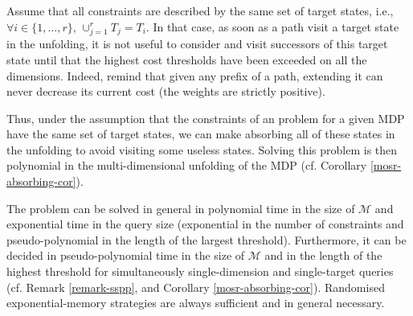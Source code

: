 \begin{remark} \label{remark-sspp}
  Assume that all constraints are described by the same set of target states, i.e., $\forall i \in \{1, \dots, r\}$, $\cup_{j=1}^r T_j = T_i$.
  In that case, as soon as a path visit a target state in the unfolding, it is not useful to consider and visit successors of this target state until that the highest cost thresholds have been exceeded on all the dimensions.
  Indeed, remind that given any prefix of a path, extending it can never decrease its current cost %
  (the weights are strictly positive).\par
  Thus, under the assumption that the constraints of an \SSPPQ{} problem for a given MDP have the same set of target states, we can make absorbing all of these states in the unfolding to avoid visiting some useless states.
  Solving this \SSPPQ{} problem is then polynomial in the multi-dimensional unfolding of the MDP (cf. Corollary \ref{mosr-absorbing-cor}).
\end{remark}

\begin{theorem}
  The \SSPPQ{} problem
  can be solved in general in polynomial time in the size of $\mathcal{M}$ and exponential time in the query size (exponential in the number of constraints and pseudo-polynomial in the length of the largest threshold). Furthermore, it
  can be decided in pseudo-polynomial time in the size of $\mathcal{M}$ and in the length of the highest threshold for simultaneously single-dimension and single-target queries (cf. Remark \ref{remark-sspp}, and Corollary \ref{mosr-absorbing-cor}).
  Randomised exponential-memory strategies are always sufficient and in general necessary.
\end{theorem}

